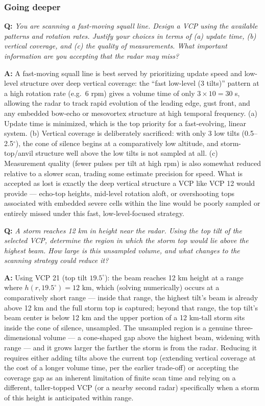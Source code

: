 \documentclass[11pt]{article}
\newenvironment{qa}[1]{\par\noindent\textbf{\color{qgray}Q: }\emph{#1}\par\noindent\textbf{A: }}{\par\vspace{6pt}}
\newcommand{\tier}[1]{\subsubsection*{#1}}
\begin{document}
\tier{Going deeper}
\begin{qa}{You are scanning a fast-moving squall line. Design a VCP using the available patterns and rotation rates. Justify your choices in terms of (a) update time, (b) vertical coverage, and (c) the quality of measurements. What important information are you accepting that the radar may miss?}
A fast-moving squall line is best served by prioritizing update speed and low-level structure over deep vertical coverage: the ``fast low-level (3 tilts)'' pattern at a high rotation rate (e.g.\ 6 rpm) gives a volume time of only $3\times10=30$ s, allowing the radar to track rapid evolution of the leading edge, gust front, and any embedded bow-echo or mesovortex structure at high temporal frequency. (a) Update time is minimized, which is the top priority for a fast-evolving, linear system. (b) Vertical coverage is deliberately sacrificed: with only 3 low tilts (0.5--2.5$^\circ$), the cone of silence begins at a comparatively low altitude, and storm-top/anvil structure well above the low tilts is not sampled at all. (c) Measurement quality (fewer pulses per tilt at high rpm) is also somewhat reduced relative to a slower scan, trading some estimate precision for speed. What is accepted as lost is exactly the deep vertical structure a VCP like VCP 12 would provide --- echo-top heights, mid-level rotation aloft, or overshooting tops associated with embedded severe cells within the line would be poorly sampled or entirely missed under this fast, low-level-focused strategy.
\end{qa}
\begin{qa}{A storm reaches 12 km in height near the radar. Using the top tilt of the selected VCP, determine the region in which the storm top would lie above the highest beam. How large is this unsampled volume, and what changes to the scanning strategy could reduce it?}
Using VCP 21 (top tilt $19.5^\circ$): the beam reaches 12 km height at a range where $h(r,19.5^\circ)=12$ km, which (solving numerically) occurs at a comparatively short range --- inside that range, the highest tilt's beam is already above 12 km and the full storm top is captured; beyond that range, the top tilt's beam center is below 12 km and the upper portion of a 12 km-tall storm sits inside the cone of silence, unsampled. The unsampled region is a genuine three-dimensional volume --- a cone-shaped gap above the highest beam, widening with range --- and it grows larger the farther the storm is from the radar. Reducing it requires either adding tilts above the current top (extending vertical coverage at the cost of a longer volume time, per the earlier trade-off) or accepting the coverage gap as an inherent limitation of finite scan time and relying on a different, taller-topped VCP (or a nearby second radar) specifically when a storm of this height is anticipated within range.
\end{qa}
\end{document}
